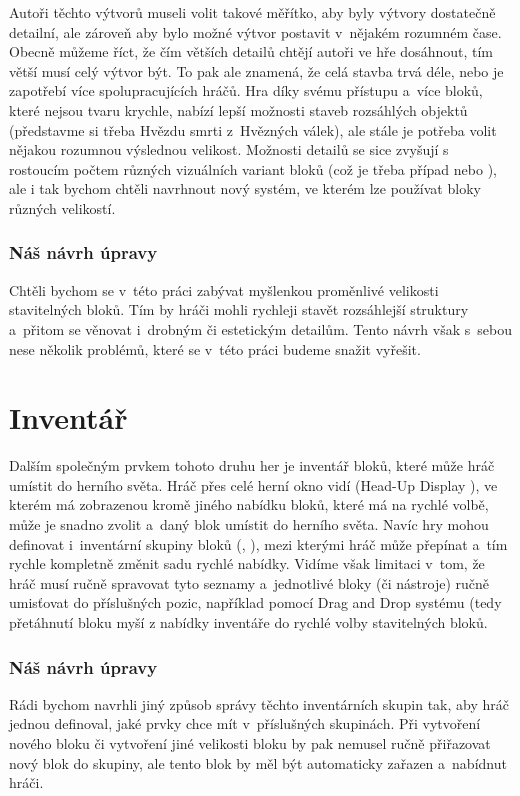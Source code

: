 Autoři těchto výtvorů museli volit takové měřítko, aby byly výtvory dostatečně detailní, ale zároveň aby bylo možné výtvor postavit v~nějakém rozumném čase. Obecně můžeme říct, že čím větších detailů chtějí autoři ve hře \MC{} dosáhnout, tím větší musí celý výtvor být. To pak ale znamená, že celá stavba trvá déle, nebo je zapotřebí více spolupracujících hráčů. Hra \SE{} díky svému přístupu a~více bloků, které nejsou tvaru krychle, nabízí lepší možnosti staveb rozsáhlých objektů (představme si třeba Hvězdu smrti z~Hvězných válek), ale stále je potřeba volit nějakou rozumnou výslednou velikost. Možnosti detailů se sice zvyšují s rostoucím počtem různých vizuálních variant bloků (což je třeba případ \SE{} nebo \NI{}), ale i tak bychom chtěli navrhnout nový systém, ve kterém lze používat bloky různých velikostí.


\subsubsection{Náš návrh úpravy}
Chtěli bychom se v~této práci zabývat myšlenkou proměnlivé velikosti stavitelných bloků. Tím by hráči mohli rychleji stavět rozsáhlejší struktury a~přitom se věnovat i~drobným či estetickým detailům. Tento návrh však s~sebou nese několik problémů, které se v~této práci budeme snažit vyřešit.


\section{Inventář}
Dalším společným prvkem tohoto druhu her je inventář bloků, které může hráč umístit do herního světa. Hráč přes celé herní okno vidí \HUD{} (Head-Up Display \citep{hud_terminology}), ve kterém má zobrazenou kromě jiného nabídku bloků, které má na rychlé volbě, může je snadno zvolit a~daný blok umístit do herního světa. Navíc hry mohou definovat i~inventární skupiny bloků (\SE{}, \ME{}), mezi kterými hráč může přepínat a~tím rychle kompletně změnit sadu rychlé nabídky. Vidíme však limitaci v~tom, že hráč musí ručně spravovat tyto seznamy a~jednotlivé bloky (či nástroje) ručně umisťovat do příslušných pozic, například pomocí Drag and Drop systému (tedy přetáhnutí bloku myší z nabídky inventáře do rychlé volby stavitelných bloků.


\subsubsection{Náš návrh úpravy}
Rádi bychom navrhli jiný způsob správy těchto inventárních skupin tak, aby hráč jednou definoval, jaké prvky chce mít v~příslušných skupinách. Při vytvoření nového bloku či vytvoření jiné velikosti bloku by pak nemusel ručně přiřazovat nový blok do skupiny, ale tento blok by měl být automaticky zařazen a~nabídnut hráči.  


